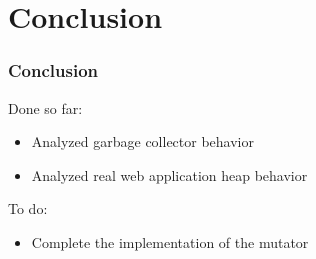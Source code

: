 %
%

\section{Conclusion}
\begin{frame}
	\frametitle{Conclusion}
	Done so far:
	\begin{itemize}
		\item Analyzed garbage collector behavior
		\item Analyzed real web application heap behavior
	\end{itemize}
	To do:
	\begin{itemize}
		\item Complete the implementation of the mutator
	\end{itemize}
\end{frame}